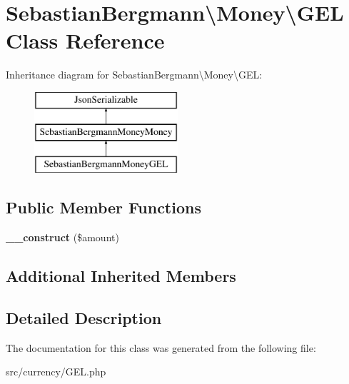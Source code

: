 \hypertarget{classSebastianBergmann_1_1Money_1_1GEL}{}\section{Sebastian\+Bergmann\textbackslash{}Money\textbackslash{}G\+E\+L Class Reference}
\label{classSebastianBergmann_1_1Money_1_1GEL}
Inheritance diagram for Sebastian\+Bergmann\textbackslash{}Money\textbackslash{}G\+E\+L\+:\begin{figure}[H]
\begin{center}
\leavevmode
\includegraphics[height=3.000000cm]{classSebastianBergmann_1_1Money_1_1GEL}
\end{center}
\end{figure}
\subsection*{Public Member Functions}
\begin{DoxyCompactItemize}
\item 
\hypertarget{classSebastianBergmann_1_1Money_1_1GEL_a8679e38dcfaca3c9bf1f20571a3b104a}{}{\bfseries \+\_\+\+\_\+construct} (\$amount)\label{classSebastianBergmann_1_1Money_1_1GEL_a8679e38dcfaca3c9bf1f20571a3b104a}

\end{DoxyCompactItemize}
\subsection*{Additional Inherited Members}


\subsection{Detailed Description}


The documentation for this class was generated from the following file\+:\begin{DoxyCompactItemize}
\item 
src/currency/G\+E\+L.\+php\end{DoxyCompactItemize}
